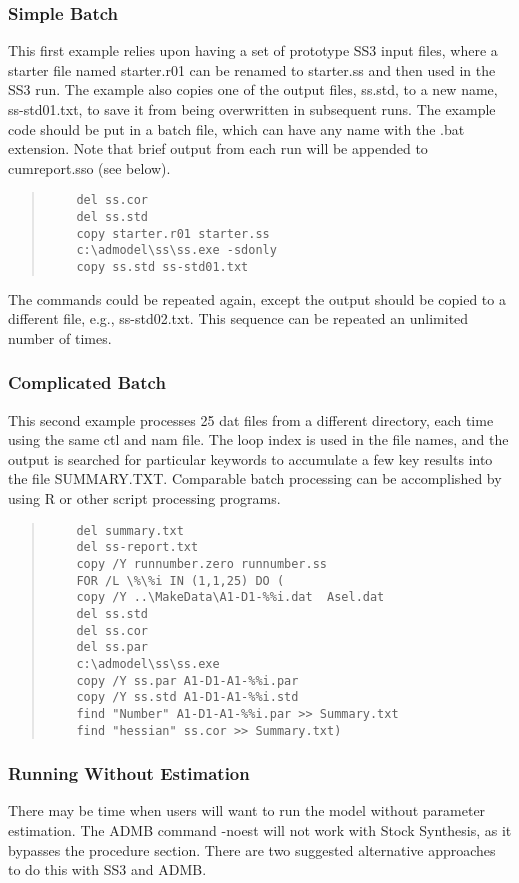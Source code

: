 \subsubsection{Simple Batch}

This first example relies upon having a set of prototype SS3 input files, where a starter file named starter.r01 can be renamed to starter.ss and then used in the SS3 run. The example also copies one of the output files, ss.std, to a new name, ss-std01.txt, to save it from being overwritten in subsequent runs. The example code should be put in a batch file, which can have any name with the .bat extension. Note that brief output from each run will be appended to cumreport.sso (see below).

\begin{quote}
	\begin{verbatim}
	del ss.cor
	del ss.std
	copy starter.r01 starter.ss
	c:\admodel\ss\ss.exe -sdonly
	copy ss.std ss-std01.txt
	\end{verbatim}
\end{quote}

The commands could be repeated again, except the output should be copied to a different file, e.g., ss-std02.txt. This sequence can be repeated an unlimited number of times.

\subsubsection{Complicated Batch}
This second example processes 25 dat files from a different directory, each time using the same ctl and nam file.  The loop index is used in the file names, and the output is searched for particular keywords to accumulate a few key results into the file SUMMARY.TXT.  Comparable batch processing can be accomplished by using R or other script processing programs.

\begin{quote}
	\begin{verbatim}
	del summary.txt
	del ss-report.txt
	copy /Y runnumber.zero runnumber.ss
	FOR /L \%\%i IN (1,1,25) DO (
	copy /Y ..\MakeData\A1-D1-%%i.dat  Asel.dat
	del ss.std
	del ss.cor
	del ss.par
	c:\admodel\ss\ss.exe
	copy /Y ss.par A1-D1-A1-%%i.par
	copy /Y ss.std A1-D1-A1-%%i.std
	find "Number" A1-D1-A1-%%i.par >> Summary.txt
	find "hessian" ss.cor >> Summary.txt)
	\end{verbatim}
\end{quote}


\hypertarget{NoEst}{}
\subsubsection{Running Without Estimation}
There may be time when users will want to run the model without parameter estimation. The ADMB command -noest will not work with Stock Synthesis, as it bypasses the procedure section. There are two suggested alternative approaches to do this with SS3 and ADMB.  

